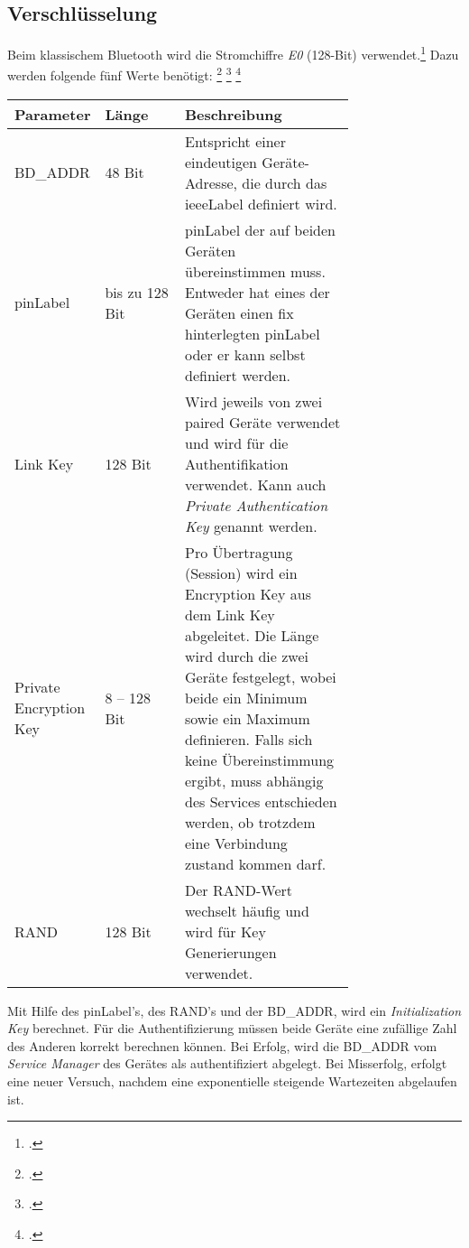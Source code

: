 \subsection{Verschlüsselung}
Beim klassischem Bluetooth wird die Stromchiffre \textit{E0} (128-Bit) verwendet.\footcite{E0_cipher_Wikipedia_2015-04-27}
Dazu werden folgende fünf Werte benötigt:
\footcite{LE_Security_Bluetooth_Development_Portal_2015-04-25}
\footcite{Bluetooth_Communication_Hybrid_Encryption_2015-04-25}
\footcite{BluetoothSecurity_Washington_2015-04-25}

\begin{table}[H]
	\small\sffamily\renewcommand{\arraystretch}{1.4}
	\begin{tabular}{p{0.25\linewidth}lp{0.5\linewidth}}
		\toprule
		Parameter & Länge & Beschreibung \\
		\midrule
		BD\_ADDR & 48 Bit & Entspricht einer eindeutigen Geräte-Adresse, die durch das \gls{ieeeLabel} definiert wird.\\
		\gls{pinLabel} & bis zu 128 Bit & \gls{pinLabel} der auf beiden Geräten übereinstimmen muss. Entweder hat eines der Geräten einen fix hinterlegten \gls{pinLabel} oder er kann selbst definiert werden.\\
		Link Key & 128 Bit  & Wird jeweils von zwei paired Geräte verwendet und wird für die Authentifikation verwendet. Kann auch \textit{Private Authentication Key} genannt werden.\\
		Private Encryption Key & 8 -- 128 Bit & Pro Übertragung (Session) wird ein Encryption Key aus dem Link Key abgeleitet. Die Länge wird durch die zwei Geräte festgelegt, wobei beide ein Minimum sowie ein Maximum definieren. Falls sich keine Übereinstimmung ergibt, muss abhängig des Services entschieden werden, ob trotzdem eine Verbindung zustand kommen darf. \\
		RAND & 128 Bit & Der RAND-Wert wechselt häufig und wird für Key Generierungen verwendet.\\
		\bottomrule
	\end{tabular}
\end{table}

Mit Hilfe des \gls{pinLabel}'s, des RAND's und der BD\_ADDR, wird ein \textit{Initialization Key} berechnet.
Für die Authentifizierung müssen beide Geräte eine zufällige Zahl des Anderen korrekt berechnen können.
Bei Erfolg, wird die BD\_ADDR vom \textit{Service Manager} des Gerätes als authentifiziert abgelegt.
Bei Misserfolg, erfolgt eine neuer Versuch, nachdem eine exponentielle steigende Wartezeiten abgelaufen ist.

